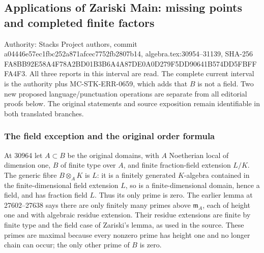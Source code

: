 \subsection{Applications of Zariski Main: missing points and completed finite factors}\label{algebra-proof-033-applications-of-zariski-main-missing-points-and-completed-finite-factors}

Authority: Stacks Project authors, commit a044\allowbreak{}46e5\allowbreak{}7ec1\allowbreak{}fbc2\allowbreak{}52a8\allowbreak{}71af\allowbreak{}cec7\allowbreak{}752f\allowbreak{}b280\allowbreak{}7b14, algebra.\AlgebraIdentifierBreak{}tex:\AlgebraIdentifierBreak{}30954--\AlgebraIdentifierBreak{}31139, SHA-256 FA8B\allowbreak{}B92E\allowbreak{}58A4\allowbreak{}F78A\allowbreak{}2BD0\allowbreak{}1B3B\allowbreak{}6A4A\allowbreak{}87DE\allowbreak{}0A0D\allowbreak{}279F\allowbreak{}5DD9\allowbreak{}0641\allowbreak{}B574\allowbreak{}DD5F\allowbreak{}BFFF\allowbreak{}A4F3. All three reports in this interval are read. The complete current interval is the authority plus MC-\AlgebraIdentifierBreak{}STK-\AlgebraIdentifierBreak{}ERR-\AlgebraIdentifierBreak{}0659, which adds that \(B\) is not a field. Two new proposed language/punctuation operations are separate from all editorial proofs below. The original statements and source exposition remain identifiable in both translated branches.

\subsubsection{The field exception and the original order formula}\label{algebra-proof-033-the-field-exception-and-the-original-order-formula}

At 30964 let \(A\subset B\) be the original domains, with \(A\) Noetherian local of dimension one, \(B\) of finite type over \(A\), and finite fraction-field extension \(L/K\). The generic fibre \(B\otimes_A K\) is \(L\): it is a finitely generated \(K\)-algebra contained in the finite-dimensional field extension \(L\), so is a finite-dimensional domain, hence a field, and has fraction field \(L\). Thus its only prime is zero. The earlier lemma at 27602--27638 says there are only finitely many primes above \(\mathfrak m_A\), each of height one and with algebraic residue extension. Their residue extensions are finite by finite type and the field case of Zariski's lemma, as used in the source. These primes are maximal because every nonzero prime has height one and no longer chain can occur; the only other prime of \(B\) is zero.


